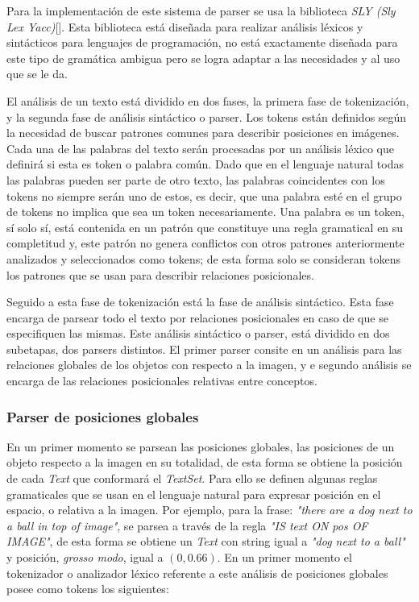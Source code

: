 Para la implementación de este sistema de parser se usa la biblioteca \textit{SLY (Sly Lex Yacc)}[\cite{sly}]. Esta biblioteca está diseñada para realizar análisis léxicos y sintácticos para lenguajes de programación, no está exactamente diseñada para este tipo de gramática ambigua pero se logra adaptar a las necesidades y al uso que se le da.

El análisis de un texto está dividido en dos fases, la primera fase de tokenización, y la segunda fase de análisis sintáctico o parser. Los tokens están definidos según la necesidad de buscar patrones comunes para describir posiciones en imágenes. Cada una de las palabras del texto serán procesadas por un análisis léxico que definirá si esta es token o palabra común. Dado que en el lenguaje natural todas las palabras pueden ser parte de otro texto, las palabras coincidentes con los tokens no siempre serán uno de estos, es decir, que una palabra esté en el grupo de tokens no implica que sea un token necesariamente. Una palabra es un token, s\'i solo s\'i, está contenida en un patrón que constituye una regla gramatical en su completitud y, este patr\'on no genera conflictos con otros patrones anteriormente analizados y seleccionados como tokens; de esta forma solo se consideran tokens los patrones que se usan para describir relaciones posicionales. 

Seguido a esta fase de tokenización est\'a la fase de análisis sintáctico. Esta fase encarga de parsear todo el texto por relaciones posicionales en caso de que se especifiquen las mismas. Este análisis sint\'actico o parser, está dividido en dos subetapas, dos parsers distintos. El primer parser consite en un análisis para las relaciones globales de los objetos con respecto a la imagen, y e segundo análisis se encarga de las relaciones posicionales relativas entre conceptos.

\subsubsection{Parser de posiciones globales}

En un primer momento se parsean las posiciones globales, las posiciones de un objeto respecto a la imagen en su totalidad, de esta forma se obtiene la posición de cada \textit{Text} que conformará el \textit{TextSet}. Para ello se definen algunas reglas gramaticales que se usan en el lenguaje natural para expresar posición en el espacio, o relativa a la imagen. Por ejemplo, para la frase: \textit{"there are a dog next to a ball in top of image"}, se parsea a través de la regla \textit{"IS text ON pos OF IMAGE"}, de esta forma se obtiene un \textit{Text} con string igual a \textit{"dog next to a ball"} y posici\'on, \textit{grosso modo}, igual a $(0, 0.66)$. En un primer momento el tokenizador o analizador léxico referente a este análisis de posiciones globales posee como tokens los siguientes:

